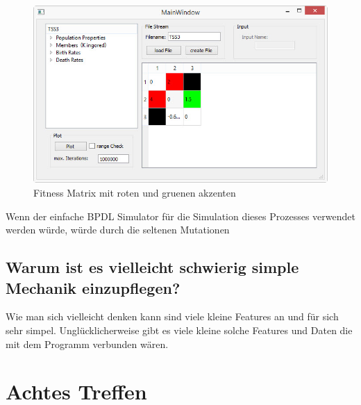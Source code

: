 \documentclass{article}
\begin{document}
	\begin{figure}[H]
		\centering
		\includegraphics[width=0.7\linewidth]{./Pictures/MainWindow_red_green_loaded}
		\caption[MainWindow_redGreenFitness]{Fitness Matrix mit roten und gruenen akzenten}
		\label{fig:MainWindow_red_green_loaded}
	\end{figure}
	Wenn der einfache BPDL Simulator für die Simulation dieses Prozesses verwendet werden würde, würde durch die seltenen Mutationen


	
	\subsection{Warum ist es vielleicht schwierig simple Mechanik einzupflegen?}
	Wie man sich vielleicht denken kann sind viele kleine Features an und für sich sehr simpel.
	Unglücklicherweise gibt es viele kleine solche Features und Daten die mit dem Programm verbunden wären. 

\newpage



\section{Achtes Treffen}
\end{document}

